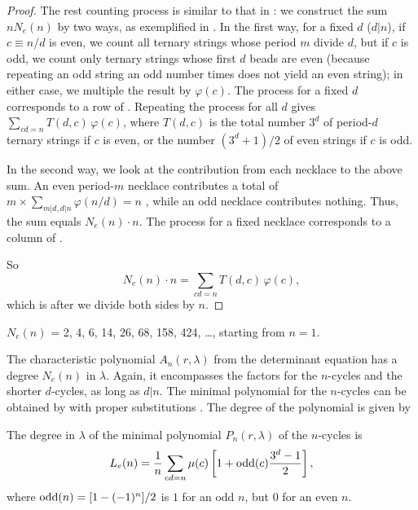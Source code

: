 \documentclass[preprint]{revtex4-1}
\begin{document}
\begin{proof}
The rest counting process is similar to that in :
%
we construct the sum $n N_e(n)$ by two ways, as exemplified in .
%
In the first way,
  for a fixed $d$ ($d|n$),
  if $c\equiv n/d$ is even,
    we count all ternary strings whose period $m$ divide $d$,
  but if $c$ is odd, we count only ternary strings
    whose first $d$ beads are even
    (because repeating an odd string an odd number times
    does not yield an even string);
  in either case, we multiple the result by $\varphi(c)$.
%
The process for a fixed $d$ corresponds to a row of .
%
Repeating the process for all $d$ gives
  $\sum_{cd = n} T(d, c) \, \varphi(c)$,
  where $T(d, c)$ is the total number $3^d$ of period-$d$ ternary strings if $c$ is even,
  or the number $(3^d+1)/2$ of even strings if $c$ is odd.


In the second way,
  we look at the contribution from each necklace to the above sum.
An even period-$m$ necklace contributes a total of
  $m \times \sum_{m|d, d|n} \varphi(n/d) = n$
  ,
  while an odd necklace contributes nothing.
Thus, the sum equals $N_e(n)\cdot n$.
%
The process for a fixed necklace corresponds to
  a column of .


So
\[
  N_e(n) \cdot n = \sum_{cd = n} T(d, c) \, \varphi(c),
\]
which is 
after we divide both sides by $n$.
\end{proof}

%
$N_e(n)$ = 2, 4, 6, 14, 26, 68, 158, 424, \dots, starting from $n = 1$.
%



The characteristic polynomial $A_n(r, \lambda)$
  from the determinant equation
  has a degree $N_e(n)$ in $\lambda$.
Again, it encompasses the factors for the $n$-cycles
  and the shorter $d$-cycles, as long as $d|n$.
The minimal polynomial for the $n$-cycles can be obtained
  by  with proper substitutions
  .
The degree of the polynomial is given by


\begin{theorem}
The degree in $\lambda$ of
the minimal polynomial $P_n(r, \lambda)$ of the $n$-cycles is
\begin{equation}
  L_e(n) = \frac{1}{n} \sum_{cd = n} \mu(c)
    \left[
      1 + \mathrm{odd}(c)\frac{3^d-1}{2}
    \right],
\label{eq:cublyndon}
\end{equation}
where $\mathrm{odd}(n) = [1 - (-1)^n]/2$
is $1$ for an odd $n$,
but $0$ for an even $n$.
\label{thm:cublyndon}
\end{theorem}
\end{document}
